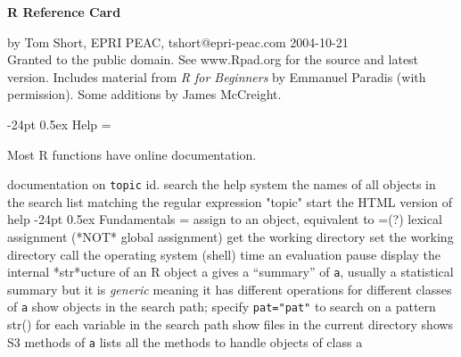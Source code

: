 \documentclass[10pt,landscape]{article}
\makeatletter
\renewcommand\section{\@startsection{section}{1}{0mm}%
                                     {-24pt}%
                                     {0.5ex}%
                                {\color{blue}\normalfont\large\bfseries}}
\newcommand{\code}{\texttt}
\makeatother
\begin{document}
\footnotesize
\begin{multicols*}{3}

\setlength{\premulticols}{1pt}
\setlength{\postmulticols}{1pt}
\setlength{\multicolsep}{1pt}
\setlength{\columnsep}{2pt}

\begin{center}
     \Large{\textbf{\color{blue}R Reference Card}} \\
\end{center}

by Tom Short, EPRI PEAC, tshort@epri-peac.com    2004-10-21\\
Granted to the public domain. See www.Rpad.org for the source and latest version.
Includes material from \emph{R for Beginners} by Emmanuel Paradis
(with permission). Some additions by James McCreight.

\section{Help}
\everypar={\hangindent=9mm}

Most R functions have online documentation.

	{documentation on \code{topic}}
	{id.}
	{search the help system}
	{the names of all objects in the search list matching the regular expression "topic"}
 start the HTML version of help \section{Fundamentals}	{\everypar={\hangindent=9mm}}
\cmdOptL{<-}	{assign to an object, equivalent to =(?)}
\cmdOptL{<<-}	{lexical assignment (*NOT* global assignment)}
	{get the working directory}
	{set the working directory}
	{call the operating system (shell)}
	{time an evaluation}
	{pause}
	{display the internal *str*ucture of an R object a}
 gives a ``summary'' of \code{a}, usually a statistical summary but it is \emph{generic}	{meaning it has different operations for different classes of \code{a}}
 show objects in the search path; specify \code{pat="pat"}	{to search on a pattern}
	{str() for each variable in the search path}
	{show files in the current directory}
	{shows S3 methods of \code{a}}
	{lists all the methods to handle objects of class a}

\end{multicols*}
\end{document}

